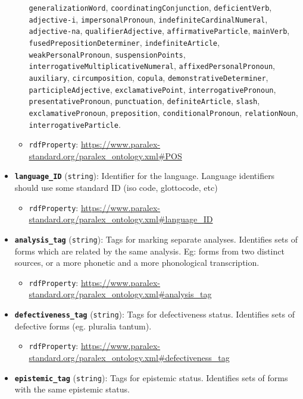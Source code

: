 \begin{itemize}
\begin{itemize}
    \texttt{generalizationWord}, \texttt{coordinatingConjunction},
    \texttt{deficientVerb}, \texttt{adjective-i},
    \texttt{impersonalPronoun}, \texttt{indefiniteCardinalNumeral},
    \texttt{adjective-na}, \texttt{qualifierAdjective},
    \texttt{affirmativeParticle}, \texttt{mainVerb},
    \texttt{fusedPrepositionDeterminer}, \texttt{indefiniteArticle},
    \texttt{weakPersonalPronoun}, \texttt{suspensionPoints},
    \texttt{interrogativeMultiplicativeNumeral},
    \texttt{affixedPersonalPronoun}, \texttt{auxiliary},
    \texttt{circumposition}, \texttt{copula},
    \texttt{demonstrativeDeterminer}, \texttt{participleAdjective},
    \texttt{exclamativePoint}, \texttt{interrogativePronoun},
    \texttt{presentativePronoun}, \texttt{punctuation},
    \texttt{definiteArticle}, \texttt{slash},
    \texttt{exclamativePronoun}, \texttt{preposition},
    \texttt{conditionalPronoun}, \texttt{relationNoun},
    \texttt{interrogativeParticle}.
  \item
    \texttt{rdfProperty}:
    \url{https://www.paralex-standard.org/paralex_ontology.xml\#POS}
  \end{itemize}
\item
  \textbf{\texttt{language\_ID}} (\texttt{string}): Identifier for the
  language. Language identifiers should use some standard ID (iso code,
  glottocode, etc)

  \begin{itemize}
  \tightlist
  \item
    \texttt{rdfProperty}:
    \url{https://www.paralex-standard.org/paralex_ontology.xml\#language_ID}
  \end{itemize}
\item
  \textbf{\texttt{analysis\_tag}} (\texttt{string}): Tags for marking
  separate analyses. Identifies sets of forms which are related by the
  same analysis. Eg: forms from two distinct sources, or a more phonetic
  and a more phonological transcription.

  \begin{itemize}
  \tightlist
  \item
    \texttt{rdfProperty}:
    \url{https://www.paralex-standard.org/paralex_ontology.xml\#analysis_tag}
  \end{itemize}
\item
  \textbf{\texttt{defectiveness\_tag}} (\texttt{string}): Tags for
  defectiveness status. Identifies sets of defective forms (eg. pluralia
  tantum).

  \begin{itemize}
  \tightlist
  \item
    \texttt{rdfProperty}:
    \url{https://www.paralex-standard.org/paralex_ontology.xml\#defectiveness_tag}
  \end{itemize}
\item
  \textbf{\texttt{epistemic\_tag}} (\texttt{string}): Tags for epistemic
  status. Identifies sets of forms with the same epistemic status.


\end{itemize}
